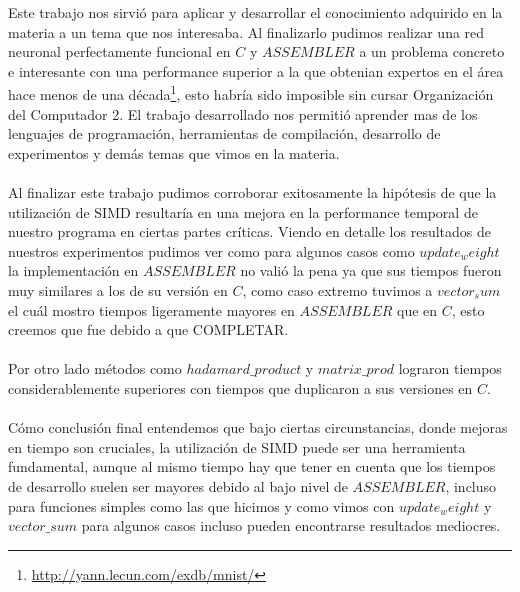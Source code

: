 
Este trabajo nos sirvió para aplicar y desarrollar el conocimiento adquirido en la materia a un tema que nos interesaba. Al finalizarlo pudimos realizar una red neuronal perfectamente funcional en $C$ y $ASSEMBLER$ a un problema concreto e interesante con una performance superior a la que obtenian expertos en el área hace menos de una década\footnote{\url{http://yann.lecun.com/exdb/mnist/}}, esto habría sido imposible sin cursar Organización del Computador 2. El trabajo desarrollado nos permitió aprender mas de los lenguajes de programación, herramientas de compilación, desarrollo de experimentos y demás temas que vimos en la materia.
\\
\\
Al finalizar este trabajo pudimos corroborar exitosamente la hipótesis de que la utilización de SIMD resultaría en una mejora en la performance temporal de nuestro programa en ciertas partes críticas. Viendo en detalle los resultados de nuestros experimentos pudimos ver como para algunos casos como $update_weight$ la implementación en $ASSEMBLER$ no valió la pena ya que sus tiempos fueron muy similares a los de su versión en $C$, como caso extremo tuvimos a $vector_sum$ el cuál mostro tiempos ligeramente mayores en $ASSEMBLER$ que en $C$, esto creemos que fue debido a que COMPLETAR.
\\
\\
Por otro lado métodos como $hadamard\_product$ y $matrix\_prod$ lograron tiempos considerablemente superiores con tiempos que duplicaron a sus versiones en $C$.
\\
\\
Cómo conclusión final entendemos que bajo ciertas circunstancias, donde mejoras en tiempo son cruciales, la utilización de SIMD puede ser una herramienta fundamental, aunque al mismo tiempo hay que tener en cuenta que los tiempos de desarrollo suelen ser mayores debido al bajo nivel de $ASSEMBLER$, incluso para funciones simples como las que hicimos y como vimos con $update_weight$ y $vector\_sum$ para algunos casos incluso pueden encontrarse resultados mediocres.